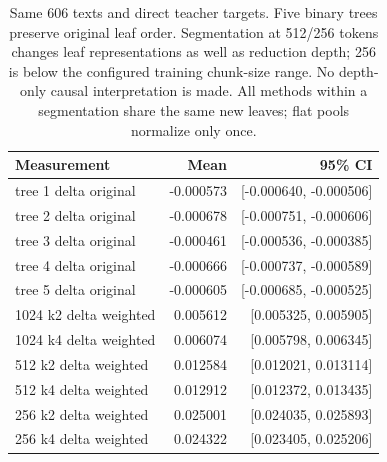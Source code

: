\begin{table}[H]
\centering\small
\begin{tabularx}{\linewidth}{Yrr}
\toprule
Measurement & Mean & 95\% CI \\
\midrule
tree 1 delta original & -0.000573 & [-0.000640, -0.000506] \\
tree 2 delta original & -0.000678 & [-0.000751, -0.000606] \\
tree 3 delta original & -0.000461 & [-0.000536, -0.000385] \\
tree 4 delta original & -0.000666 & [-0.000737, -0.000589] \\
tree 5 delta original & -0.000605 & [-0.000685, -0.000525] \\
1024 k2 delta weighted & 0.005612 & [0.005325, 0.005905] \\
1024 k4 delta weighted & 0.006074 & [0.005798, 0.006345] \\
512 k2 delta weighted & 0.012584 & [0.012021, 0.013114] \\
512 k4 delta weighted & 0.012912 & [0.012372, 0.013435] \\
256 k2 delta weighted & 0.025001 & [0.024035, 0.025893] \\
256 k4 delta weighted & 0.024322 & [0.023405, 0.025206] \\
\bottomrule
\end{tabularx}
\caption{Same 606 texts and direct teacher targets. Five binary trees preserve original leaf order. Segmentation at 512/256 tokens changes leaf representations as well as reduction depth; 256 is below the configured training chunk-size range. No depth-only causal interpretation is made. All methods within a segmentation share the same new leaves; flat pools normalize only once.}
\label{tab:tree-families}
\end{table}
